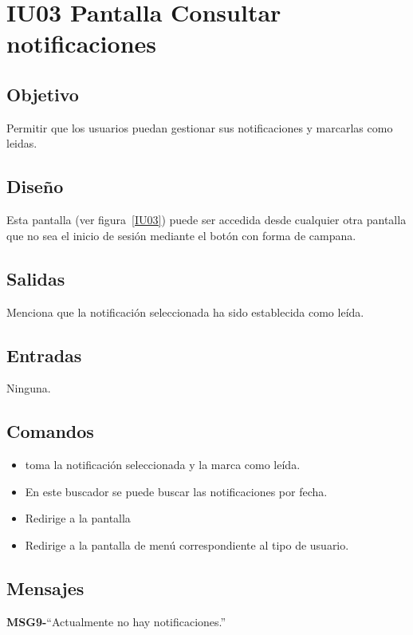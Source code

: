 
\section{IU03 Pantalla Consultar notificaciones}

\subsection{Objetivo}
Permitir que los usuarios puedan gestionar sus notificaciones y marcarlas como leidas.
\subsection{Diseño}
    Esta pantalla  (ver figura~\ref{IU03}) puede ser accedida desde cualquier otra pantalla que no sea el inicio de sesión mediante el botón con forma de campana.

\subsection{Salidas}
Menciona que la notificación seleccionada ha sido establecida como leída.
\subsection{Entradas}
   Ninguna.

\subsection{Comandos}
\begin{itemize}
    \item {} toma la notificación seleccionada y la marca como leída.
    \item {} En este buscador se puede buscar las notificaciones por fecha.
    \item {} Redirige a la pantalla 
    \item {} Redirige a la pantalla de menú correspondiente al tipo de usuario.
\end{itemize}

\subsection{Mensajes}
     
\begin{Citemize}
    \item {\bf MSG9-}{``Actualmente no hay notificaciones.''} 
\end{Citemize}



